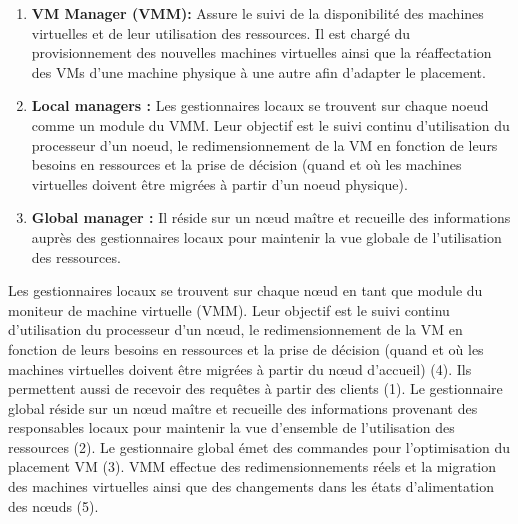\begin{onehalfspace}
\begin{enumerate} [label=\Roman*)]
\item \textbf{VM Manager (VMM):} Assure le suivi de la disponibilité des machines virtuelles et de leur utilisation des ressources. Il est chargé du provisionnement des nouvelles machines virtuelles ainsi que la réaffectation des VMs d’une machine physique à une autre afin d’adapter le placement.
\item \textbf{Local managers :} Les gestionnaires locaux se trouvent sur chaque noeud comme un module du VMM. Leur objectif est le suivi continu d’utilisation du processeur d’un noeud, le redimensionnement de la VM en fonction de leurs besoins en ressources et la prise de décision (quand et où les machines virtuelles doivent être migrées à partir d'un noeud physique).

\item \textbf{Global manager :} Il réside sur un nœud maître et recueille des informations auprès des gestionnaires locaux pour maintenir la vue globale de l'utilisation des ressources.
\end{enumerate}

Les gestionnaires locaux se trouvent sur chaque nœud en tant que module du moniteur de machine virtuelle (VMM). Leur objectif est le suivi continu d'utilisation du processeur d'un nœud, le redimensionnement de la VM en fonction de leurs besoins en ressources et la prise de décision (quand et où les machines virtuelles doivent être migrées à partir du nœud d'accueil) (4). Ils permettent aussi  de recevoir des requêtes à partir des clients (1). Le gestionnaire global réside sur un nœud maître et recueille des informations provenant des responsables locaux pour maintenir la vue d'ensemble de l'utilisation des ressources (2). Le gestionnaire global émet des commandes pour l'optimisation du placement VM (3). VMM effectue des redimensionnements réels et la migration des machines virtuelles ainsi que des changements dans les états d'alimentation des nœuds (5).
\end{onehalfspace}

